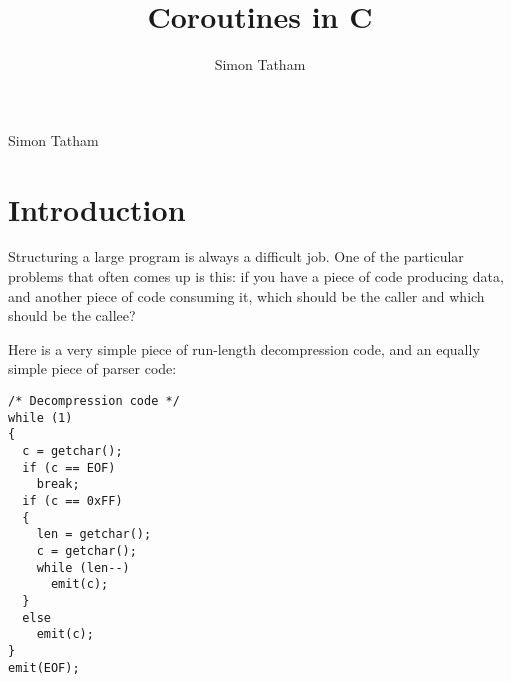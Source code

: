 \documentclass[12pt]{article}
\title{Coroutines in C}
\author{Simon Tatham}
\begin{document}
\maketitle

%

\newpage
\tableofcontents
\newpage

\begin{CJK}{UTF8}{bsmi} %
\begin{comment}
.oO Phrack 49 Oo.

Volume Seven, Issue Forty Nine File 14 of 16

BugTraq, r00t, and Underground.Org

 bring you

\end{comment}

\begin{center}
Simon Tatham

\end{center}
\section{Introduction}

 Structuring a large program is always a difficult job. One of the particular problems that often comes up is this: if you have a piece of code producing data, and another piece of code consuming it, which should be the caller and which should be the callee?

 Here is a very simple piece of run-length decompression code, and an equally simple piece of parser code: 

\newpage
\begin{multicols}{2}

\begin{lstlisting}[caption=decompression, basicstyle=\footnotesize]
/* Decompression code */
while (1) 
{
  c = getchar();
  if (c == EOF)
    break;
  if (c == 0xFF) 
  {
    len = getchar();
    c = getchar();
    while (len--)
      emit(c);
  } 
  else
    emit(c);
}
emit(EOF);

    
\end{lstlisting}


\end{multicols}
\end{CJK}
\end{document}
